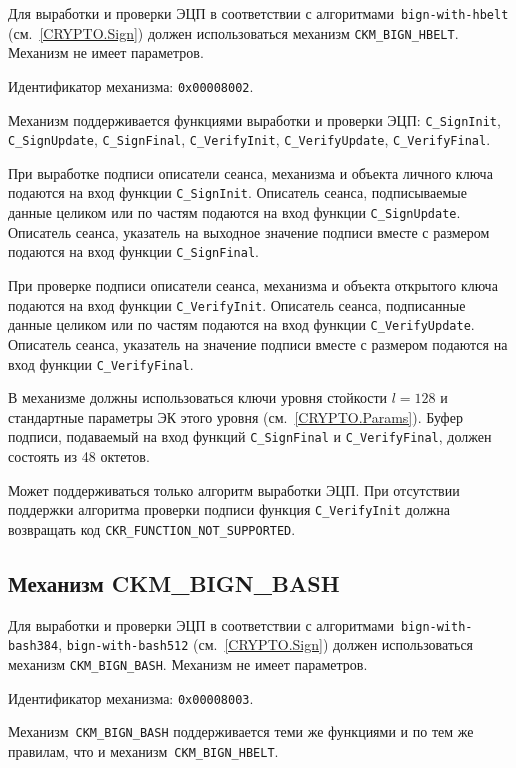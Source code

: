Для выработки и проверки ЭЦП в соответствии с 
алгоритмами~\texttt{bign-with-hbelt} (см.~\ref{CRYPTO.Sign}) должен 
использоваться механизм \verb|CKM_BIGN_HBELT|.
%
Механизм не имеет параметров.

Идентификатор механизма: \texttt{0x00008002}.

Механизм поддерживается функциями выработки и проверки ЭЦП: 
\verb|C_SignInit|, \verb|C_SignUpdate|, \verb|C_SignFinal|, 
\verb|C_VerifyInit|, \verb|C_VerifyUpdate|, \verb|C_VerifyFinal|.

При выработке подписи описатели сеанса, механизма и объекта
личного ключа подаются на вход функции \verb|C_SignInit|.
Описатель сеанса, подписываемые данные целиком или по частям
подаются на вход функции \verb|C_SignUpdate|.
Описатель сеанса, указатель на выходное значение подписи вместе с размером
подаются на вход функции \verb|C_SignFinal|.

При проверке подписи описатели сеанса, механизма и объекта
открытого ключа подаются на вход функции \verb|C_VerifyInit|.
Описатель сеанса, подписанные данные целиком или по частям подаются
на вход функции \verb|C_VerifyUpdate|.
Описатель сеанса, указатель на значение подписи вместе с размером
подаются на вход функции \verb|C_VerifyFinal|.

В механизме должны использоваться ключи уровня стойкости $l=128$ 
и стандартные параметры ЭК этого уровня (см.~\ref{CRYPTO.Params}).
% 
Буфер подписи, подаваемый на вход функций \verb|C_SignFinal| и 
\verb|C_VerifyFinal|, должен состоять из 48 октетов.

Может поддерживаться только алгоритм выработки ЭЦП.
При отсутствии поддержки алгоритма проверки подписи
функция \verb|C_VerifyInit| должна возвращать код 
\verb|CKR_FUNCTION_NOT_SUPPORTED|.

\subsection{Механизм CKM\_BIGN\_BASH}\label{CRYPTOKI.SignBash}

Для выработки и проверки ЭЦП в соответствии с 
алгоритмами~\texttt{bign-with-bash384}, \texttt{bign-with-bash512} 
(см.~\ref{CRYPTO.Sign}) должен использоваться механизм 
\verb|CKM_BIGN_BASH|.
%
Механизм не имеет параметров.

Идентификатор механизма: \texttt{0x00008003}.

Механизм~\verb|CKM_BIGN_BASH| поддерживается теми же функциями и по тем же 
правилам, что и механизм~\verb|CKM_BIGN_HBELT|.


